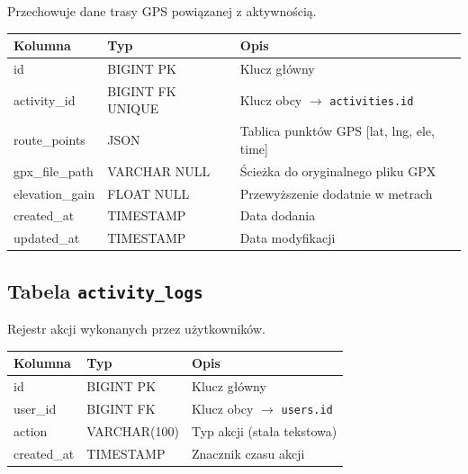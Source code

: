 \documentclass[12pt,a4paper]{report}
\begin{document}
Przechowuje dane trasy GPS powiązanej z aktywnością.

\begin{center}
\begin{tabularx}{\textwidth}{|l|l|X|}
\hline
\textbf{Kolumna}        & \textbf{Typ}              & \textbf{Opis}                        \\
\hline
id                      & BIGINT PK                 & Klucz główny                         \\
activity\_id            & BIGINT FK UNIQUE          & Klucz obcy $\to$ \texttt{activities.id} \\
route\_points           & JSON                      & Tablica punktów GPS [{lat, lng, ele, time}] \\
gpx\_file\_path         & VARCHAR NULL              & Ścieżka do oryginalnego pliku GPX    \\
elevation\_gain         & FLOAT NULL                & Przewyższenie dodatnie w metrach     \\
created\_at             & TIMESTAMP                 & Data dodania                         \\
updated\_at             & TIMESTAMP                 & Data modyfikacji                     \\
\hline
\end{tabularx}
\end{center}

\subsection{Tabela \texttt{activity\_logs}}

Rejestr akcji wykonanych przez użytkowników.

\begin{center}
\begin{tabularx}{\textwidth}{|l|l|X|}
\hline
\textbf{Kolumna}        & \textbf{Typ}              & \textbf{Opis}                        \\
\hline
id                      & BIGINT PK                 & Klucz główny                         \\
user\_id                & BIGINT FK                 & Klucz obcy $\to$ \texttt{users.id}   \\
action                  & VARCHAR(100)              & Typ akcji (stała tekstowa)           \\
created\_at             & TIMESTAMP                 & Znacznik czasu akcji                 \\
\hline
\end{tabularx}
\end{center}
\end{document}
